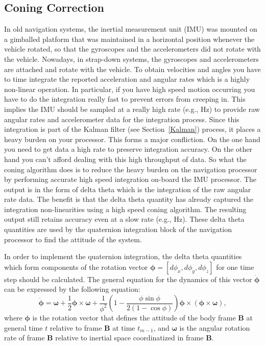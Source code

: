 \documentclass[journal]{IEEEtran}
\begin{document}
\subsection{Coning Correction}
In old navigation systems, the inertial measurement unit (IMU) was mounted on a gimballed platform that was maintained in a horizontal position whenever the vehicle rotated, so that the gyroscopes and the accelerometers did not rotate with the vehicle. Nowadays, in
strap-down systems, the gyroscopes and accelerometers are attached and rotate with the vehicle. To obtain velocities and angles you have to time integrate the reported acceleration and angular rates which is a highly non-linear operation. In particular, if you have high speed motion occurring you have to do the integration really fast to prevent errors from creeping in. This implies the IMU should be sampled at a  really high rate (e.g., \unit[1000]{Hz}) to provide raw angular rates and accelerometer data for the integration process. Since this integration is part of the Kalman filter (see Section~\ref{Kalman}) process, it places a heavy burden on your processor. This forms a major confliction. On the one hand you need to get data a high rate to preserve integration accuracy. On the other hand you can't afford dealing with this high throughput of data. So what the coning algorithm does is to reduce the heavy burden on the navigation processor by performing accurate high speed integration on-board the IMU processor. The output is in the form of delta theta which is the integration of the raw  angular rate data. The benefit is that the delta theta quantity has already captured the integration non-linearities using a high speed coning algorithm. The resulting output still retains accuracy even at a slow rate (e.g., \unit[100]{Hz}). These delta theta quantities are used by the quaternion integration block of the navigation processor to find the attitude of the system.  \par

In order to implement the quaternion integration, the delta theta quantities which form components of the  rotation vector $\boldsymbol{\phi} = [{d\phi}_x, {d\phi}_y,{d\phi}_z]$ for one time step should be calculated. The general equation for the dynamics of this vector  $\dot{\boldsymbol{\phi}}$ can be expressed by the following equation: 
\begin{equation}\label{eq_equation phi dot}
     {\dot{\boldsymbol{\phi}}}= \boldsymbol{\omega}+\frac{1}{2}\boldsymbol{\phi}\times\boldsymbol{\omega}+\frac{1}{\phi^2}\left(1-\frac{\phi\sin\phi}{2(1-\cos\phi)}\right)\boldsymbol{\phi}\times(\boldsymbol{\phi}\times\boldsymbol{\omega}),
\end{equation}
where $\boldsymbol{\phi}$ is the rotation vector that defines the attitude of the  body frame $\boldsymbol{B}$ at general time $t$  relative to frame  $\boldsymbol{B}$ at time $t_{m-1}$, and $\boldsymbol{\omega}$ is the angular rotation rate of frame $\boldsymbol{B}$ relative to inertial space coordinatized in frame $\boldsymbol{B}$.
\end{document}
